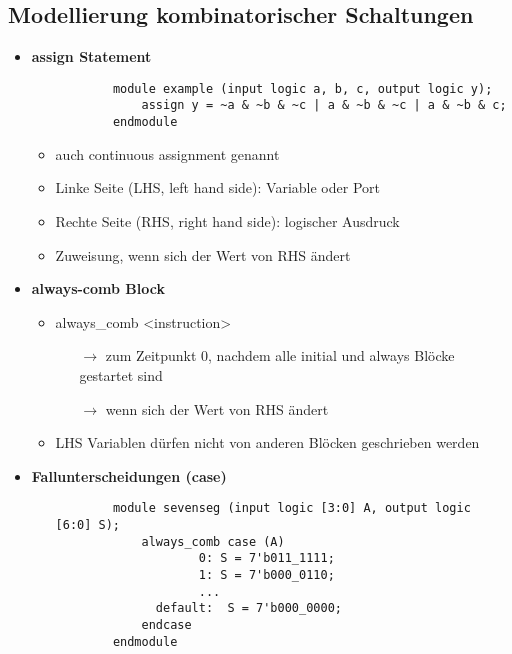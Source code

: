 \subsection{Modellierung kombinatorischer Schaltungen}
\begin{itemize}

\item \textbf{assign Statement}
	\begin{itemize}
	\item[]
		\begin{lstlisting}
		module example (input logic a, b, c, output logic y);
			assign y = ~a & ~b & ~c | a & ~b & ~c | a & ~b & c;
		endmodule
		\end{lstlisting}
	\item auch continuous assignment genannt
	\item Linke Seite (LHS, left hand side): Variable oder Port
	\item Rechte Seite (RHS, right hand side): logischer Ausdruck
	\item Zuweisung, wenn sich der Wert von RHS ändert
	\end{itemize}
	
\item \textbf{always-comb Block}
	\begin{itemize}
	\item always\_comb <instruction>
		\begin{itemize}
		\item[$\rightarrow$] zum Zeitpunkt 0, nachdem alle initial und always Blöcke gestartet sind
		\item[$\rightarrow$] wenn sich der Wert von RHS ändert
		\end{itemize}
		
	\item LHS Variablen dürfen nicht von anderen Blöcken geschrieben werden
	\end{itemize}

\pagebreak

\item \textbf{Fallunterscheidungen (case)}
	\begin{itemize}
	\item[]
		\begin{lstlisting}
		module sevenseg (input logic [3:0] A, output logic [6:0] S);
			always_comb case (A)
					0: S = 7'b011_1111;
					1: S = 7'b000_0110;
					...
			  default: 	S = 7'b000_0000;
			endcase
		endmodule
		\end{lstlisting}
		

\end{itemize}
\end{itemize}
